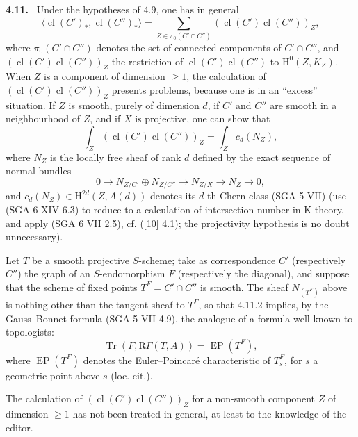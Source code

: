 \documentclass[11pt]{article}
\newenvironment{statement}[1]{\par\medskip\noindent\textbf{#1.}\ }{\par\medskip}
\renewcommand{\H}{\mathrm{H}}
\newcommand{\R}{\mathrm{R}}
\providecommand{\cl}{\operatorname{cl}}
\providecommand{\Tr}{\operatorname{Tr}}
\providecommand{\EP}{\operatorname{EP}}
\providecommand{\Tr}{\operatorname{Tr}}
\providecommand{\Tr}{\operatorname{Tr}}
\providecommand{\R}{\mathrm R}
\providecommand{\Tr}{\operatorname{Tr}}
\providecommand{\cl}{\operatorname{cl}}
\providecommand{\EP}{\operatorname{EP}}
\providecommand{\cl}{\operatorname{cl}}
\providecommand{\Tr}{\operatorname{Tr}}
\begin{document}
\begin{statement}{4.11}
Under the hypotheses of 4.9, one has in general
\begin{equation}
\tag{4.11.1}
\langle \cl(C')_*,\cl(C'')_*\rangle
=
\sum_{Z\in\pi_0(C'\cap C'')}(\cl(C')\cl(C''))_Z,
\end{equation}
where $\pi_0(C'\cap C'')$ denotes the set of connected components of $C'\cap C''$, and $(\cl(C')\cl(C''))_Z$ the restriction of $\cl(C')\cl(C'')$ to $\H^0(Z,K_Z)$. When $Z$ is a component of dimension $\geq 1$, the calculation of $(\cl(C')\cl(C''))_Z$ presents problems, because one is in an ``excess'' situation. If $Z$ is smooth, purely of dimension $d$, if $C'$ and $C''$ are smooth in a neighbourhood of $Z$, and if $X$ is projective, one can show that
\begin{equation}
\tag{4.11.2}
\int_Z(\cl(C')\cl(C''))_Z=\int_Z c_d(N_Z),
\end{equation}
where $N_Z$ is the locally free sheaf of rank $d$ defined by the exact sequence of normal bundles
\[
0\longrightarrow N_{Z/C'}\oplus N_{Z/C''}\longrightarrow N_{Z/X}\longrightarrow N_Z\longrightarrow 0,
\]
and $c_d(N_Z)\in \H^{2d}(Z,A(d))$ denotes its $d$-th Chern class (SGA 5 VII) (use (SGA 6 XIV 6.3) to reduce to a calculation of intersection number in K-theory, and apply (SGA 6 VII 2.5), cf. ([10] 4.1); the projectivity hypothesis is no doubt unnecessary).

Let $T$ be a smooth projective $S$-scheme; take as correspondence $C'$ (respectively $C''$) the graph of an $S$-endomorphism $F$ (respectively the diagonal), and suppose that the scheme of fixed points $T^F=C'\cap C''$ is smooth. The sheaf $N_{(T^F)}$ above is nothing other than the tangent sheaf to $T^F$, so that 4.11.2 implies, by the Gauss--Bonnet formula (SGA 5 VII 4.9), the analogue of a formula well known to topologists:
\begin{equation}
\tag{4.11.3}
\Tr(F,\R\Gamma(T,A))=\EP(T^F),
\end{equation}
where $\EP(T^F)$ denotes the Euler--Poincaré characteristic of $T_s^F$, for $s$ a geometric point above $s$ (loc. cit.).
\end{statement}

The calculation of $(\cl(C')\cl(C''))_Z$ for a non-smooth component $Z$ of dimension $\geq 1$ has not been treated in general, at least to the knowledge of the editor.
\end{document}
